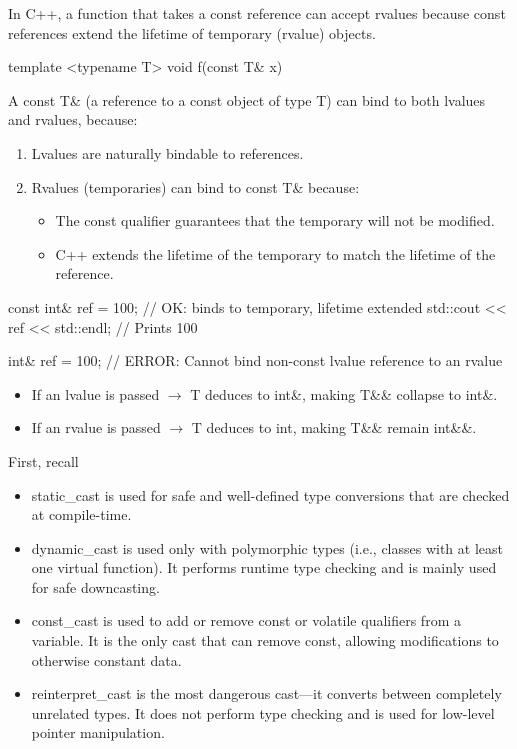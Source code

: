 \documentclass{report}
\begin{document}
    \pagebreak 
    \bigbreak \noindent 
    In C++, a function that takes a const reference can accept rvalues because const references extend the lifetime of temporary (rvalue) objects.
    \bigbreak \noindent 
    \begin{cppcode}
        template <typename T>
        void f(const T& x) {}
    \end{cppcode}
    \bigbreak \noindent 
    A const T\& (a reference to a const object of type T) can bind to both lvalues and rvalues, because:
    \begin{enumerate}
        \item Lvalues are naturally bindable to references.
        \item Rvalues (temporaries) can bind to const T\& because:
            \begin{itemize}
                \item The const qualifier guarantees that the temporary will not be modified.
                \item C++ extends the lifetime of the temporary to match the lifetime of the reference.
            \end{itemize}
    \end{enumerate}
    \bigbreak \noindent 
    \begin{cppcode}
        const int& ref = 100; // OK: binds to temporary, lifetime extended
        std::cout << ref << std::endl; // Prints 100

        int& ref = 100; // ERROR: Cannot bind non-const lvalue reference to an rvalue
    \end{cppcode}
    \bigbreak \noindent 
    \begin{itemize}
        \item If an lvalue is passed $\to$ T deduces to int\&, making T\&\& collapse to int\&.
        \item If an rvalue is passed $\to$ T deduces to int, making T\&\& remain int\&\&.
    \end{itemize}



    
    \pagebreak 
    \bigbreak \noindent 
    First, recall
    \begin{itemize}
        \item static\_cast is used for safe and well-defined type conversions that are checked at compile-time.
        \item dynamic\_cast is used only with polymorphic types (i.e., classes with at least one virtual function). It performs runtime type checking and is mainly used for safe downcasting.
        \item const\_cast is used to add or remove const or volatile qualifiers from a variable. It is the only cast that can remove const, allowing modifications to otherwise constant data.
        \item reinterpret\_cast is the most dangerous cast—it converts between completely unrelated types. It does not perform type checking and is used for low-level pointer manipulation.
    \end{itemize}
    \bigbreak \noindent 
\end{document}

